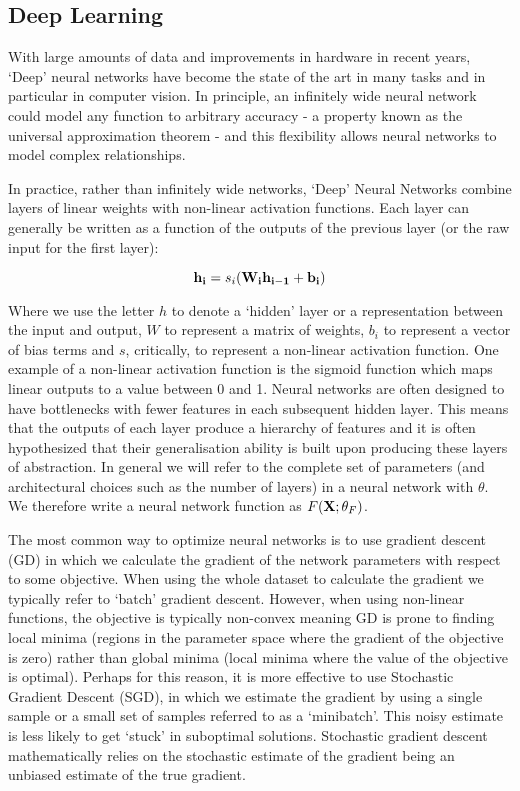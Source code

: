 \subsection{Deep Learning}

With large amounts of data and improvements in hardware in recent years, `Deep' neural networks have become the state of the art in many tasks and in particular in computer vision. In principle, an infinitely wide neural network could model any function to arbitrary accuracy - a property known as the universal approximation theorem - and this flexibility allows neural networks to model complex relationships. 

In practice, rather than infinitely wide networks, `Deep' Neural Networks combine layers of linear weights with non-linear activation functions. Each layer can generally be written as a function of the outputs of the previous layer (or the raw input for the first layer):

$$
\bold{h_i}=s_i(\bold{W_ih_{i-1}}+\bold{b_i})
$$

Where we use the letter $h$ to denote a `hidden' layer or a representation between the input and output, $W$ to represent a matrix of weights, $b_i$ to represent a vector of bias terms and $s$, critically, to represent a non-linear activation function. One example of a non-linear activation function is the sigmoid function which maps linear outputs to a value between 0 and 1. Neural networks are often designed to have bottlenecks with fewer features in each subsequent hidden layer. This means that the outputs of each layer produce a hierarchy of features and it is often hypothesized that their generalisation ability is built upon producing these layers of abstraction\cite{li2018survey}. In general we will refer to the complete set of parameters (and architectural choices such as the number of layers) in a neural network with $\theta$. We therefore write a neural network function as $F(\bold{X};\theta_F)$.

The most common way to optimize neural networks is to use gradient descent (GD) in which we calculate the gradient of the network parameters with respect to some objective. When using the whole dataset to calculate the gradient we typically refer to `batch' gradient descent. However, when using non-linear functions, the objective is typically non-convex meaning GD is prone to finding local minima (regions in the parameter space where the gradient of the objective is zero) rather than global minima (local minima where the value of the objective is optimal). Perhaps for this reason, it is more effective to use Stochastic Gradient Descent (SGD), in which we estimate the gradient by using a single sample or a small set of samples referred to as a `minibatch'. This noisy estimate is less likely to get `stuck' in suboptimal solutions. Stochastic gradient descent mathematically relies on the stochastic estimate of the gradient being an unbiased estimate of the true gradient.

